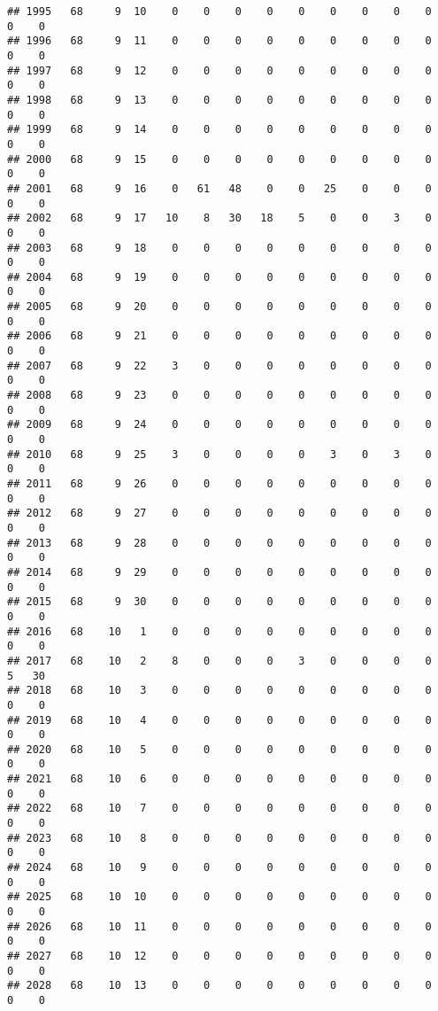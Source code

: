\documentclass[]{article}
\begin{document}
\begin{verbatim}
## 1995   68     9  10    0    0    0    0    0    0    0    0    0    0    0
## 1996   68     9  11    0    0    0    0    0    0    0    0    0    0    0
## 1997   68     9  12    0    0    0    0    0    0    0    0    0    0    0
## 1998   68     9  13    0    0    0    0    0    0    0    0    0    0    0
## 1999   68     9  14    0    0    0    0    0    0    0    0    0    0    0
## 2000   68     9  15    0    0    0    0    0    0    0    0    0    0    0
## 2001   68     9  16    0   61   48    0    0   25    0    0    0    0    0
## 2002   68     9  17   10    8   30   18    5    0    0    3    0    0    0
## 2003   68     9  18    0    0    0    0    0    0    0    0    0    0    0
## 2004   68     9  19    0    0    0    0    0    0    0    0    0    0    0
## 2005   68     9  20    0    0    0    0    0    0    0    0    0    0    0
## 2006   68     9  21    0    0    0    0    0    0    0    0    0    0    0
## 2007   68     9  22    3    0    0    0    0    0    0    0    0    0    0
## 2008   68     9  23    0    0    0    0    0    0    0    0    0    0    0
## 2009   68     9  24    0    0    0    0    0    0    0    0    0    0    0
## 2010   68     9  25    3    0    0    0    0    3    0    3    0    0    0
## 2011   68     9  26    0    0    0    0    0    0    0    0    0    0    0
## 2012   68     9  27    0    0    0    0    0    0    0    0    0    0    0
## 2013   68     9  28    0    0    0    0    0    0    0    0    0    0    0
## 2014   68     9  29    0    0    0    0    0    0    0    0    0    0    0
## 2015   68     9  30    0    0    0    0    0    0    0    0    0    0    0
## 2016   68    10   1    0    0    0    0    0    0    0    0    0    0    0
## 2017   68    10   2    8    0    0    0    3    0    0    0    0    5   30
## 2018   68    10   3    0    0    0    0    0    0    0    0    0    0    0
## 2019   68    10   4    0    0    0    0    0    0    0    0    0    0    0
## 2020   68    10   5    0    0    0    0    0    0    0    0    0    0    0
## 2021   68    10   6    0    0    0    0    0    0    0    0    0    0    0
## 2022   68    10   7    0    0    0    0    0    0    0    0    0    0    0
## 2023   68    10   8    0    0    0    0    0    0    0    0    0    0    0
## 2024   68    10   9    0    0    0    0    0    0    0    0    0    0    0
## 2025   68    10  10    0    0    0    0    0    0    0    0    0    0    0
## 2026   68    10  11    0    0    0    0    0    0    0    0    0    0    0
## 2027   68    10  12    0    0    0    0    0    0    0    0    0    0    0
## 2028   68    10  13    0    0    0    0    0    0    0    0    0    0    0

\end{verbatim}
\end{document}
